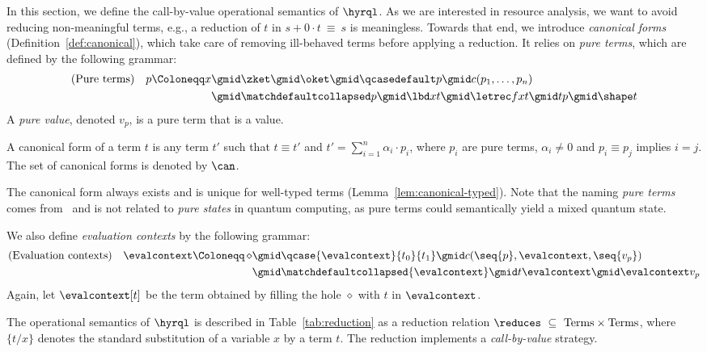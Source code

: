 In this section, we define the call-by-value operational semantics of $\hyrql$.
As we are interested in resource analysis, we want to avoid reducing
non-meaningful terms, e.g., a reduction of $t$ in $s + 0 \cdot t \ \equiv\ s$
is meaningless. Towards that end, we introduce \emph{canonical forms}
(Definition~\ref{def:canonical}), which take care of removing ill-behaved terms
before applying a reduction. It relies on \emph{pure terms}, which are defined
by the following grammar:
\[
  \begin{aligned}
    (\text{Pure terms}) \quad  p  \Coloneqq x &\gmid \zket \gmid \oket
    \gmid \qcasedefault p  \gmid c(p_1, \dots, p_n) \\
    &\gmid \matchdefaultcollapsed p \gmid \lbd x t \gmid \letrec f x t
    \gmid tp \gmid \shape t
  \end{aligned}
\]
A \emph{pure value}, denoted $v_p$, is a pure term that is a value.
\begin{definition}
  \label{def:canonical}
  A canonical form of a term $t$ is any term $t'$ such that
  $t\equiv t'$ and $t'=\sum_{i=1}^n \alpha_i \cdot p_i $, where $p_i$ are
  pure terms, $\alpha_i \neq 0$ and $p_i \equiv p_j$ implies  $i = j$. The
  set of canonical forms is denoted by $\can$.
\end{definition}

The canonical form always exists and is unique for well-typed terms
(Lemma~\ref{lem:canonical-typed}). Note that the naming \emph{pure terms} comes
from~\cite{DCM22} and is not related to \emph{pure states} in quantum computing,
as pure terms could semantically yield a mixed quantum state.

We also define \emph{evaluation contexts} by the following grammar:
\begin{align*}
  (\text{Evaluation contexts}) \quad \evalcontext \Coloneqq \, \diamond
  &\gmid \qcase{\evalcontext}{t_0}{t_1} \gmid c(\seq{p},
  \evalcontext, \seq{v_p}) \\
  &\gmid \matchdefaultcollapsed{\evalcontext} \gmid t \evalcontext \gmid
  \evalcontext v_p
\end{align*}
Again, let  $\evalcontext[t]$ be the term obtained by filling the
hole $\diamond$ with $t$ in $\evalcontext$.

The operational semantics of $\hyrql$ is described in Table~\ref{tab:reduction}
as a reduction relation $\reduces \ \subseteq
\ \text{Terms} \times \text{Terms}$, where $\{t/x\}$ denotes the
standard substitution of a variable $x$ by a term $t$. The reduction
implements a \emph{call-by-value} strategy.

